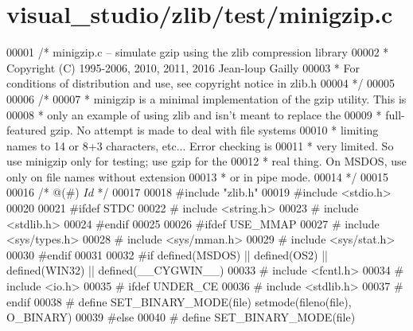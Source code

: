 \hypertarget{visual__studio_2zlib_2test_2minigzip_8c_source}{}\section{visual\+\_\+studio/zlib/test/minigzip.c}
\label{visual__studio_2zlib_2test_2minigzip_8c_source}

\begin{DoxyCode}
00001 \textcolor{comment}{/* minigzip.c -- simulate gzip using the zlib compression library}
00002 \textcolor{comment}{ * Copyright (C) 1995-2006, 2010, 2011, 2016 Jean-loup Gailly}
00003 \textcolor{comment}{ * For conditions of distribution and use, see copyright notice in zlib.h}
00004 \textcolor{comment}{ */}
00005 
00006 \textcolor{comment}{/*}
00007 \textcolor{comment}{ * minigzip is a minimal implementation of the gzip utility. This is}
00008 \textcolor{comment}{ * only an example of using zlib and isn't meant to replace the}
00009 \textcolor{comment}{ * full-featured gzip. No attempt is made to deal with file systems}
00010 \textcolor{comment}{ * limiting names to 14 or 8+3 characters, etc... Error checking is}
00011 \textcolor{comment}{ * very limited. So use minigzip only for testing; use gzip for the}
00012 \textcolor{comment}{ * real thing. On MSDOS, use only on file names without extension}
00013 \textcolor{comment}{ * or in pipe mode.}
00014 \textcolor{comment}{ */}
00015 
00016 \textcolor{comment}{/* @(#) $Id$ */}
00017 
00018 \textcolor{preprocessor}{#include "zlib.h"}
00019 \textcolor{preprocessor}{#include <stdio.h>}
00020 
00021 \textcolor{preprocessor}{#ifdef STDC}
00022 \textcolor{preprocessor}{#  include <string.h>}
00023 \textcolor{preprocessor}{#  include <stdlib.h>}
00024 \textcolor{preprocessor}{#endif}
00025 
00026 \textcolor{preprocessor}{#ifdef USE\_MMAP}
00027 \textcolor{preprocessor}{#  include <sys/types.h>}
00028 \textcolor{preprocessor}{#  include <sys/mman.h>}
00029 \textcolor{preprocessor}{#  include <sys/stat.h>}
00030 \textcolor{preprocessor}{#endif}
00031 
00032 \textcolor{preprocessor}{#if defined(MSDOS) || defined(OS2) || defined(WIN32) || defined(\_\_CYGWIN\_\_)}
00033 \textcolor{preprocessor}{#  include <fcntl.h>}
00034 \textcolor{preprocessor}{#  include <io.h>}
00035 \textcolor{preprocessor}{#  ifdef UNDER\_CE}
00036 \textcolor{preprocessor}{#    include <stdlib.h>}
00037 \textcolor{preprocessor}{#  endif}
00038 \textcolor{preprocessor}{#  define SET\_BINARY\_MODE(file) setmode(fileno(file), O\_BINARY)}
00039 \textcolor{preprocessor}{#else}
00040 \textcolor{preprocessor}{#  define SET\_BINARY\_MODE(file)}

\end{DoxyCode}
